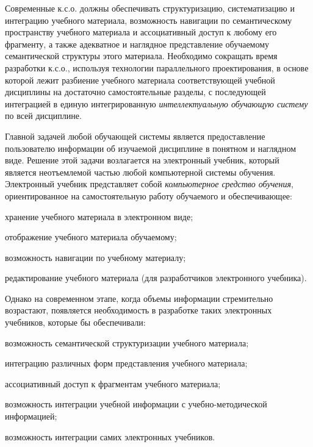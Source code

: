 Современные к.с.о. должны обеспечивать структуризацию, систематизацию и интеграцию учебного материала, возможность навигации по семантическому пространству учебного материала и ассоциативный доступ к любому его фрагменту, а также адекватное и наглядное представление обучаемому семантической структуры этого материала. Необходимо сокращать время разработки к.с.о., используя технологии параллельного проектирования, в основе которой лежит разбиение учебного материала соответствующей учебной дисциплины на достаточно самостоятельные разделы, с последующей интеграцией в единую интегрированную \textit{интеллектуальную обучающую систему} по всей дисциплине.

Главной задачей любой обучающей системы является предоставление пользователю информации об изучаемой дисциплине в понятном и наглядном виде. Решение этой задачи возлагается на электронный учебник, который является неотъемлемой частью любой компьютерной системы обучения. Электронный учебник представляет собой \textit{компьютерное средство обучения}, ориентированное на самостоятельную работу обучаемого и обеспечивающее:

\begin{textitemize}
	\item хранение учебного материала в электронном виде;
	\item отображение учебного материала обучаемому;
	\item возможность навигации по учебному материалу;
	\item редактирование учебного материала (для разработчиков электронного учебника).
\end{textitemize}

Однако на современном этапе, когда объемы информации стремительно возрастают, появляется необходимость в разработке таких электронных учебников, которые бы обеспечивали:

\begin{textitemize}
	\item возможность семантической структуризации учебного материала;
	\item интеграцию различных форм представления учебного материала;
	\item ассоциативный доступ к фрагментам учебного материала;
	\item возможность интеграции учебной информации с учебно-методической информацией;
	\item возможность интеграции самих электронных учебников.
\end{textitemize}

